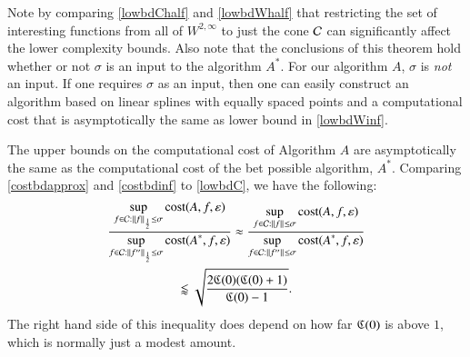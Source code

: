\documentclass[review]{elsarticle}
\newcommand{\abstol}{\varepsilon}
\theoremstyle{definition}
\renewcommand{\cw}{W}
\begin{document}
Note by comparing  \eqref{lowbdChalf} and \eqref{lowbdWhalf} that restricting the set of interesting functions from all of $ \cw^{2,\infty}$ to just the cone $\mathcal{C}$ can significantly affect the lower complexity bounds.  Also note that the conclusions of this theorem hold whether or not $\sigma$ is an input to the algorithm $A^*$.  For our algorithm $A$, $\sigma$ is \emph{not} an input.  If one requires $\sigma$ as an input, then one can easily construct an algorithm based on linear splines with equally spaced points and a computational cost that is asymptotically the same as lower bound in \eqref{lowbdWinf}.

The upper bounds on the computational cost of Algorithm $A$  are asymptotically the same as the computational cost of the bet possible algorithm, $A^*$.  Comparing \eqref{costbdapprox} and \eqref{costbdinf} to \eqref{lowbdC}, we have the following:
\begin{multline*}
\frac{\displaystyle \sup_{f \in \cc : \norm[\frac 12]{f} \le \sigma} \cost(A,f,\abstol)}{\displaystyle	\sup_{f \in \cc : \norm[\frac12]{f''} \le\sigma } \cost(A^*,f,\abstol) } \approx
\frac{\displaystyle \sup_{f \in \cc : \norm{f} \le \sigma} \cost(A,f,\abstol)}{\displaystyle	\sup_{f \in \cc : \norm{f''} \le\sigma } \cost(A^*,f,\abstol) } \\ \lessapprox \sqrt{\frac{2 \fC(0)(\fC(0)+1)}{\fC(0)-1}}.
\end{multline*}
The right hand side of this inequality does depend on how far $\mathfrak{C}(0)$ is above $1$, which is normally just a modest amount.  
\end{document}
